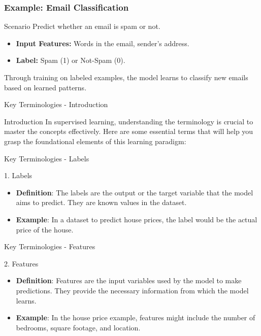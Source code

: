 \documentclass[aspectratio=169]{beamer}
\begin{document}
\begin{frame}[fragile]
    \frametitle{Example: Email Classification}
    \begin{block}{Scenario}
        Predict whether an email is spam or not.
    \end{block}
    
    \begin{itemize}
        \item \textbf{Input Features:} Words in the email, sender’s address.
        \item \textbf{Label:} Spam (1) or Not-Spam (0).
    \end{itemize}
    
    Through training on labeled examples, the model learns to classify new emails based on learned patterns.
\end{frame}

\begin{frame}[fragile]{Key Terminologies - Introduction}
    \begin{block}{Introduction}
        In supervised learning, understanding the terminology is crucial to master the concepts effectively. Here are some essential terms that will help you grasp the foundational elements of this learning paradigm:
    \end{block}
\end{frame}

\begin{frame}[fragile]{Key Terminologies - Labels}
    \begin{block}{1. Labels}
        \begin{itemize}
            \item \textbf{Definition}: The labels are the output or the target variable that the model aims to predict. They are known values in the dataset.
            \item \textbf{Example}: In a dataset to predict house prices, the label would be the actual price of the house.
        \end{itemize}
    \end{block}
\end{frame}

\begin{frame}[fragile]{Key Terminologies - Features}
    \begin{block}{2. Features}
        \begin{itemize}
            \item \textbf{Definition}: Features are the input variables used by the model to make predictions. They provide the necessary information from which the model learns.
            \item \textbf{Example}: In the house price example, features might include the number of bedrooms, square footage, and location.
        \end{itemize}
    \end{block}
\end{frame}
\end{document}
